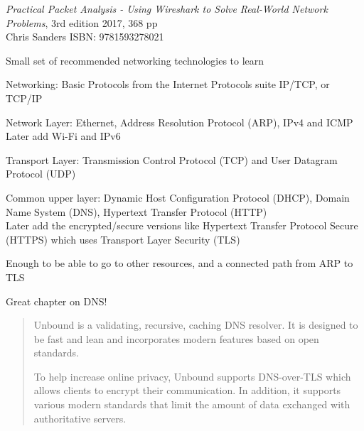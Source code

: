 \documentclass[Screen16to9,17pt]{foils}
\begin{document}



\begin{list2}
\item \emph{Practical Packet Analysis - Using Wireshark to Solve Real-World Network Problems}, 3rd edition 2017, 368 pp\\
Chris Sanders ISBN: 9781593278021
\end{list2}





Small set of recommended networking technologies to learn

Networking: Basic Protocols from the Internet Protocols suite IP/TCP, or TCP/IP
\begin{list2}
\item Network Layer: Ethernet, Address Resolution Protocol (ARP), IPv4 and ICMP\\
Later add Wi-Fi and IPv6
\item Transport Layer: Transmission Control Protocol (TCP) and User Datagram Protocol (UDP)
\item Common upper layer: Dynamic Host Configuration Protocol (DHCP), Domain Name System (DNS),
Hypertext Transfer Protocol (HTTP)\\
Later add the encrypted/secure versions like Hypertext Transfer Protocol Secure (HTTPS) which uses Transport Layer Security (TLS)
\end{list2}

Enough to be able to go to other resources, and a connected path from ARP to TLS

Great chapter on DNS!


\begin{quote}
Unbound is a validating, recursive, caching DNS resolver. It is designed to be fast and lean and incorporates modern features based on open standards.

To help increase online privacy, Unbound supports DNS-over-TLS which allows clients to encrypt their communication. In addition, it supports various modern standards that limit the amount of data exchanged with authoritative servers.
\end{quote}
\end{document}

